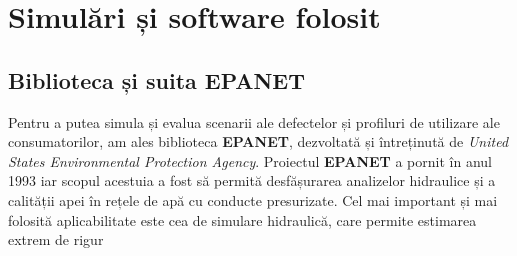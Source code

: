 \chapter{Simulări și software folosit}
\label{chap:simulari}

\section{Biblioteca și suita EPANET}

Pentru a putea simula și evalua scenarii ale defectelor și profiluri de utilizare ale consumatorilor, am ales biblioteca \textbf{EPANET}, dezvoltată și întreținută de \textit{United States Environmental Protection Agency}. Proiectul \textbf{EPANET} a pornit în anul 1993 iar scopul acestuia a fost să permită desfășurarea analizelor hidraulice și a calității apei în rețele de apă cu conducte presurizate. Cel mai important și mai folosită aplicabilitate este cea de simulare hidraulică, care permite estimarea extrem de rigur

